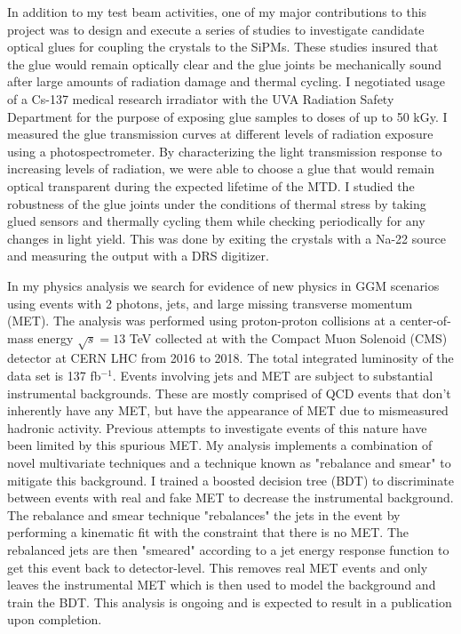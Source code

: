 \documentclass[10pt,a4paper,sans,english]{moderncv}        %
\begin{document}
In addition to my test beam activities, one of my major contributions to this project was to design and execute a series of studies to investigate candidate optical glues for coupling the crystals to the SiPMs.  These studies insured that the glue would remain optically clear and the glue joints be mechanically sound after large amounts of radiation damage and thermal cycling.  I negotiated usage of a Cs-137 medical research irradiator with the UVA Radiation Safety Department for the purpose of exposing glue samples to doses of up to 50 kGy.  I measured the glue transmission curves at different levels of radiation exposure using a photospectrometer.  By characterizing the light transmission response to increasing levels of radiation, we were able to choose a glue that would remain optical transparent during the expected lifetime of the MTD.  I studied the robustness of the glue joints under the conditions of thermal stress by taking glued sensors and thermally cycling them while checking periodically for any changes in light yield.  This was done by exiting the crystals with a Na-22 source and measuring the output with a DRS digitizer.


In my physics analysis we search for evidence of new physics in GGM scenarios using events with 2 photons, jets, and large missing transverse momentum (MET).  The analysis was performed using proton-proton collisions at a center-of-mass energy $\sqrt{s}=13$ TeV collected at with the Compact Muon Solenoid (CMS) detector at CERN LHC from 2016 to 2018.  The total integrated luminosity of the data set is 137 fb$^{-1}$. Events involving jets and MET are subject to substantial instrumental backgrounds.  These are mostly comprised of QCD events that don't inherently have any MET, but have the appearance of MET due to mismeasured hadronic activity.  Previous attempts to investigate events of this nature have been limited by this spurious MET. My analysis implements a combination of novel multivariate techniques and a technique known as "rebalance and smear" to mitigate this background.  I trained a boosted decision tree (BDT) to discriminate between events with real and fake MET to decrease the instrumental background.  The rebalance and smear technique "rebalances" the jets in the event by performing a kinematic fit with the constraint that there is no MET.  The rebalanced jets are then "smeared" according to a jet energy response function to get this event back to detector-level.  This removes real MET events and only leaves the instrumental MET which is then used to model the background and train the BDT. This analysis is ongoing and is expected to result in a publication upon completion.
\end{document}
